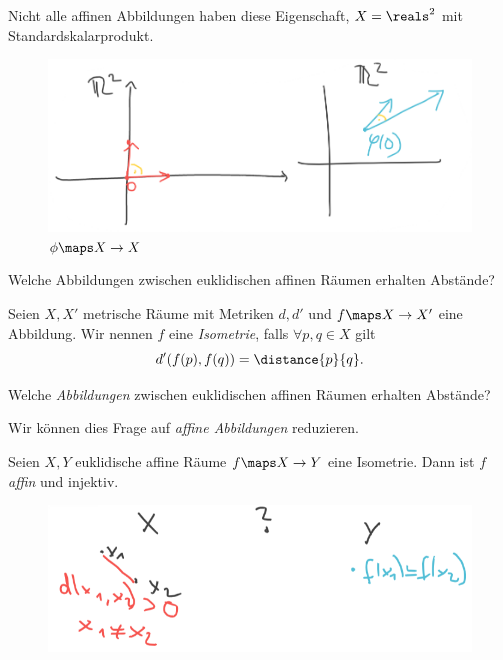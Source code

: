 Nicht alle affinen Abbildungen haben diese Eigenschaft, \zb \( X=\reals^2 \) mit Standardskalarprodukt.
\begin{figure}[H]
  \centering
  \includegraphics[width=0.5\linewidth]{figures/aehnlichkeiten_gegenbeispiel}
  \caption*{\( \phi\maps X\to X \)}
  \label{fig:aehnlichkeiten_gegenbeispiel}
\end{figure}
\begin{frage*}
  Welche Abbildungen zwischen euklidischen affinen Räumen erhalten Abstände?
\end{frage*}
\begin{definition*}
  Seien \( X,X' \) metrische Räume mit Metriken \( d,d' \) und \( f\maps X\to X' \) eine Abbildung. Wir nennen \( f \) eine \emph{Isometrie}, falls \( \forall p,q\in X \) gilt
  \begin{equation*}
    d'(f(p),f(q))=\distance{p}{q}.
  \end{equation*}
\end{definition*}
\begin{frage*}
  Welche \emph{Abbildungen} zwischen euklidischen affinen Räumen erhalten Abstände?

  \tto Wir können dies Frage auf \emph{affine Abbildungen} reduzieren.
\end{frage*}
\begin{satz}\label{isometrie_affin_und_injektiv}
  Seien \( X,Y \) euklidische affine Räume \( f\maps X\to Y \) eine Isometrie. Dann ist \( f \) \emph{affin} und injektiv.
  \begin{figure}[H]
    \centering
    \includegraphics[width=0.5\linewidth]{figures/isometrie_wirklich_injektiv}
    \label{fig:isometrie_wirklich_injektiv}
  \end{figure}
\end{satz}
